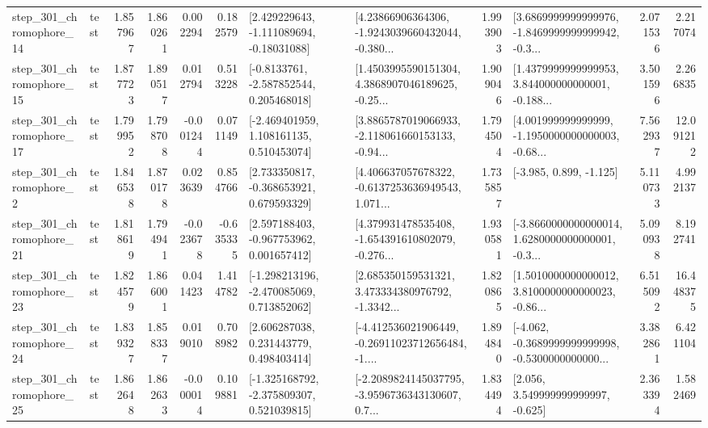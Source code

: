 \begin{tabular}{llrrrrllrlrr}
  step\_301\_chromophore\_14 &      test &      1.857967 &    1.860261 &      0.002294 &  0.182579 &    [2.429229643, -1.111089694, -0.18031088] &  [4.23866906364306, -1.9243039660432044, -0.380... &       1.993903 &  [3.6869999999999976, -1.8469999999999942, -0.3... &            2.071536 &          2.217074 \\
  step\_301\_chromophore\_15 &      test &      1.877723 &    1.890517 &      0.012794 &  0.513228 &     [-0.8133761, -2.587852544, 0.205468018] &  [1.4503995590151304, 4.3868907046189625, -0.25... &       1.909046 &  [1.4379999999999953, 3.844000000000001, -0.188... &            3.501596 &          2.266835 \\
  step\_301\_chromophore\_17 &      test &      1.799952 &    1.798708 &     -0.001244 &  0.071149 &    [-2.469401959, 1.108161135, 0.510453074] &  [3.8865787019066933, -2.118061660153133, -0.94... &       1.794504 &  [4.001999999999999, -1.1950000000000003, -0.68... &            7.562937 &         12.091212 \\
   step\_301\_chromophore\_2 &      test &      1.846538 &    1.870178 &      0.023639 &  0.854766 &    [2.733350817, -0.368653921, 0.679593329] &  [4.406637057678322, -0.6137253636949543, 1.071... &       1.735857 &                            [-3.985, 0.899, -1.125] &            5.110733 &          4.992137 \\
  step\_301\_chromophore\_21 &      test &      1.818619 &    1.794941 &     -0.023678 & -0.635335 &    [2.597188403, -0.967753962, 0.001657412] &  [4.379931478535408, -1.654391610802079, -0.276... &       1.930581 &  [-3.8660000000000014, 1.6280000000000001, -0.3... &            5.090938 &          8.192741 \\
  step\_301\_chromophore\_23 &      test &      1.824579 &    1.866001 &      0.041423 &  1.414782 &   [-1.298213196, -2.470085069, 0.713852062] &  [2.685350159531321, 3.473334380976792, -1.3342... &       1.820865 &  [1.5010000000000012, 3.8100000000000023, -0.86... &            6.515092 &         16.448375 \\
  step\_301\_chromophore\_24 &      test &      1.839327 &    1.858337 &      0.019010 &  0.708982 &     [2.606287038, 0.231443779, 0.498403414] &  [-4.412536021906449, -0.26911023712656484, -1.... &       1.894840 &  [-4.062, -0.3689999999999998, -0.5300000000000... &            3.382861 &          6.421104 \\
  step\_301\_chromophore\_25 &      test &      1.862648 &    1.862633 &     -0.000014 &  0.109881 &   [-1.325168792, -2.375809307, 0.521039815] &  [-2.2089824145037795, -3.9596736343130607, 0.7... &       1.834494 &                 [2.056, 3.549999999999997, -0.625] &            2.363394 &          1.582469 \\

\end{tabular}
